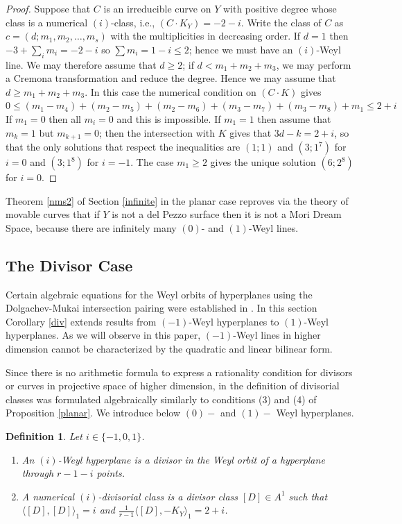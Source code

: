 \documentclass[12pt]{article}
\newtheorem{definition}[equation]{Definition}
\numberwithin{equation}{section}
\numberwithin{subeq}{equation}
\begin{document}
\begin{proof}
Suppose that $C$ is an irreducible curve on $Y$ with positive degree
whose class is a numerical $(i)$-class, i.e., $(C\cdot K_Y) = -2-i$.
Write the class of $C$ as $c = (d;m_1,m_2,\ldots,m_s)$
with the multiplicities in decreasing order.
If $d=1$ then $-3+\sum_i m_i = -2-i$ so $\sum m_i = 1-i \leq 2$;
hence we must have an $(i)$-Weyl line.
We may therefore assume that $d \geq 2$;
if $d < m_1+m_2+m_3$,
we may perform a Cremona transformation and reduce the degree.
Hence we may assume that $d \geq m_1+m_2+m_3$.
In this case the numerical condition on $(C\cdot K)$ gives 
$
0\leq (m_1-m_4)+(m_2-m_5)+(m_2-m_6)+(m_3-m_7)+(m_3-m_8)+m_1 \leq 2+i 
$
If $m_1=0$ then all $m_i=0$ and this is impossible.
If $m_1=1$ then assume that $m_k=1$ but $m_{k+1} = 0$;
then the intersection with $K$ gives that $3d-k=2+i$,
so that the only solutions that respect the inequalities are
$(1;1)$ and $(3; 1^7)$ for $i=0$ and $(3; 1^8)$ for $i=-1$.
The case $m_1 \geq 2$ gives the unique solution $(6; 2^8)$ for $i=0$.
\end{proof}

Theorem \ref{nms2} of Section \ref{infinite} in the planar case  reproves via the theory of movable curves  that if $Y$ is not a del Pezzo surface then it is not a Mori Dream Space,
because there are infinitely many $(0)$- and $(1)$-Weyl lines.

\subsection{The Divisor Case}\label{diva}

Certain algebraic equations for the Weyl orbits of hyperplanes
using the Dolgachev-Mukai intersection pairing
were established in \cite{DP}.
In this section Corollary \ref{div} extends results from $(-1)$-Weyl hyperplanes
to $(1)$-Weyl hyperplanes. 
As we will observe in this paper, $(-1)$-Weyl lines in higher dimension
cannot be characterized by the quadratic and linear bilinear form.

Since there is no arithmetic formula
to express a rationality condition for divisors or curves
in projective space of higher dimension,
in \cite{DP} the definition of divisorial classes
was formulated algebraically similarly to conditions
(3) and (4) of Proposition \ref{planar}.
We introduce below $(0)-$ and $(1)-$ Weyl hyperplanes.

\begin{definition}\label{def} Let $i\in \{-1,0,1\}$.
\begin{enumerate}
\item An \emph{$(i)$-Weyl hyperplane} is a divisor in the Weyl orbit
of a hyperplane through $r-1-i$ points.

\item A \emph{numerical $(i)$-divisorial class} is a divisor class $[D] \in A^1$
such that  $\langle  [D], [D] \rangle_1 =i$
and $\frac{1}{r-1}\langle  [D], -K_Y \rangle_1=2+i$.
\end{enumerate}
\end{definition}
\end{document}
